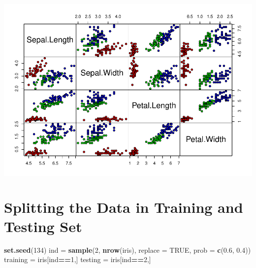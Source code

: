 \documentclass[
]{article}
\newenvironment{Shaded}{\begin{snugshade}}{\end{snugshade}}
\newcommand{\AttributeTok}[1]{\textcolor[rgb]{0.13,0.29,0.53}{#1}}
\newcommand{\ConstantTok}[1]{\textcolor[rgb]{0.56,0.35,0.01}{#1}}
\newcommand{\DecValTok}[1]{\textcolor[rgb]{0.00,0.00,0.81}{#1}}
\newcommand{\FloatTok}[1]{\textcolor[rgb]{0.00,0.00,0.81}{#1}}
\newcommand{\FunctionTok}[1]{\textcolor[rgb]{0.13,0.29,0.53}{\textbf{#1}}}
\newcommand{\NormalTok}[1]{#1}
\newcommand{\OtherTok}[1]{\textcolor[rgb]{0.56,0.35,0.01}{#1}}
\newcommand{\SpecialCharTok}[1]{\textcolor[rgb]{0.81,0.36,0.00}{\textbf{#1}}}
\newcommand{\StringTok}[1]{\textcolor[rgb]{0.31,0.60,0.02}{#1}}
\begin{document}
\begin{Shaded}
\end{Shaded}

\includegraphics{LDA_QDA_IRIS_files/figure-latex/unnamed-chunk-1-1.pdf}

\hypertarget{splitting-the-data-in-training-and-testing-set}{%
\section{Splitting the Data in Training and Testing
Set}\label{splitting-the-data-in-training-and-testing-set}}

\begin{Shaded}
\begin{Highlighting}[]
\FunctionTok{set.seed}\NormalTok{(}\DecValTok{134}\NormalTok{)}
\NormalTok{ind }\OtherTok{=} \FunctionTok{sample}\NormalTok{(}\DecValTok{2}\NormalTok{, }\FunctionTok{nrow}\NormalTok{(iris), }\AttributeTok{replace =} \ConstantTok{TRUE}\NormalTok{, }\AttributeTok{prob =} \FunctionTok{c}\NormalTok{(}\FloatTok{0.6}\NormalTok{, }\FloatTok{0.4}\NormalTok{))}
\NormalTok{training }\OtherTok{=}\NormalTok{ iris[ind}\SpecialCharTok{==}\DecValTok{1}\NormalTok{,]}
\NormalTok{testing }\OtherTok{=}\NormalTok{ iris[ind}\SpecialCharTok{==}\DecValTok{2}\NormalTok{,]}
\end{Highlighting}
\end{Shaded}
\end{document}
